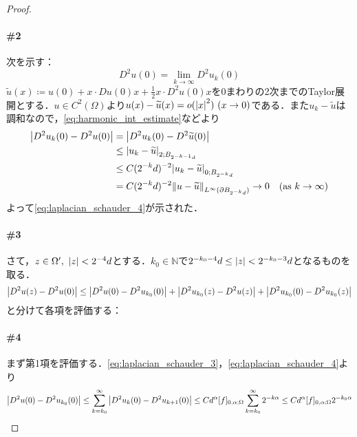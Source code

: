 \documentclass[a4paper]{ltjsarticle}
\newcommand{\Nset}{\mathbb{N}}
\newcommand{\Om}{\Omega}
\newcommand{\1}{\mathbbm{1}}
\numberwithin{equation}{section}
\theoremstyle{definition}
\begin{document}
\begin{proof}
    \paragraph*{\#2}次を示す：
    \begin{equation}
        D^2u(0)=\lim_{k\to\infty}D^2 u_k(0)\label{eq:laplacian_schauder_4}
    \end{equation}
    $\widetilde{u}(x)\coloneqq u(0)+x\cdot Du(0)x+\frac{1}{2}x\cdot D^2u(0)x$を$0$まわりの2次までのTaylor展開とする．$u\in C^2(\Om)$より$u(x)-\widetilde{u}(x)=o(\abs{x}^2)\ (x\to0)$である．また$u_k-\widetilde{u}$は調和なので，\eqref{eq:harmonic_int_estimate}などより
    \begin{align}
        \abs{D^2u_k(0)-D^2u(0)}&=\abs{D^2u_k(0)-D^2\widetilde{u}(0)}\\
        &\leq \abs{u_k-\widetilde{u}}_{2;B_{2^{-k-1}d}}\\
        &\leq C(2^{-k}d)^{-2}\abs{u_k-\widetilde{u}}_{0;B_{2^{-k}d}}\\
        &=C(2^{-k}d)^{-2}\norm{u-\widetilde{u}}_{L^\infty(\partial B_{2^{-k}d})}\to 0\quad (\text{as $k\to\infty$})
    \end{align}
    よって\eqref{eq:laplacian_schauder_4}が示された．

    \paragraph*{\#3}さて，$z\in \Om',\ \abs{z}<2^{-4}d$とする．$k_0\in\Nset$で$2^{-k_0-4}d\leq \abs{z}<2^{-k_0-3}d$となるものを取る．
    \begin{equation}
        \abs{D^2u(z)-D^2u(0)}\leq \abs{D^2 u(0)-D^2u_{k_0}(0)}+\abs{D^2u_{k_0}(z)-D^2u(z)}+\abs{D^2u_{k_0}(0)-D^2u_{k_0}(z)}\label{eq:laplacian_schauder_5}
    \end{equation}
    と分けて各項を評価する：

    \paragraph*{\#4}まず第1項を評価する．\eqref{eq:laplacian_schauder_3}，\eqref{eq:laplacian_schauder_4}より
    \begin{equation}
        \abs{D^2u(0)-D^2u_{k_0}(0)}\leq \sum_{k=k_0}^\infty\abs{D^2u_k(0)-D^2u_{k+1}(0)}\leq Cd^\alpha [f]_{0,\alpha;\Om}\sum_{k=k_{0}}^\infty 2^{-k\alpha}\leq Cd^\alpha [f]_{0,\alpha;\Om}2^{-k_0\alpha }
    \end{equation}

\end{proof}
\end{document}
